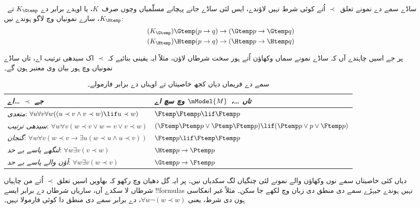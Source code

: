 \documentclass[../../../include/open-logic-section]{subfiles}
\begin{document}


ساڈے سمے دے نمونے تعلق~$\prec$ اُتے کوئی شرط نہیں لاؤندے، ایس لئی
ساڈے جانے پہچانے مسلّمیاں وچوں صرف~$K$، یا اوہدے برابر دے
$K_{\Gtemp}$ تے~$K_{\Htemp}$، سارے نمونیاں وچ لاگو ہوندے نیں:
\begin{align*}
\tag{$K_{\Gtemp}$}  \Gtemp (p \to q) & \to (\Gtemp p \to \Gtemp q)\\
\tag{$K_{\Htemp}$}  \Htemp (p \to q) & \to (\Htemp p \to \Htemp q)
\end{align*}

پر جے اسیں چاہندے آں کہ ساڈے نمونے سماں وکھاؤن اُتے ہور سخت شرطاں لاؤن،
مثلاً ایہ یقینی بنائیے کہ $\prec$ اک سیدھی ترتیب اے، تاں ساڈے
نمونیاں وچ ہور بیان وی معتبر ہون گے۔

\begin{table}[t]
  \begin{tabular}{| p{} || p{} |}
    \hline
    {\emph{جے $\prec$ \dots اے}} & {\emph{تاں \dots،~$\mModel{M}$ وچ سچ اے}} \\
    \hline \hline
    \emph{متعدی}: \newline
    $\forall u \forall v \forall w ((u \prec v \land v \prec w) \lif u \prec w)$ & 
    $\Ftemp \Ftemp p \lif \Ftemp p$  \\
    \hline 
    \emph{سیدھی ترتیب}: \newline
    $\forall w \forall v (w \prec v \lor w = v \lor v \prec w)$ &  
    $(\Ftemp \Ptemp  p \lor \Ptemp \Ftemp p) \lif (\Ptemp p \lor p \lor \Ftemp p)$\\
    \hline
    \emph{گنجان}: \newline
    $\forall w \forall v (w \prec v \to \exists u(w \prec u \land u \prec v))$ &  
    $\Ftemp p \lif \Ftemp \Ftemp p$ \\
    \hline
    \emph{لنگھے پاسے بے حد}: \newline
    $\forall w \exists v( v \prec w)$ &  
    $\Htemp p \to \Ptemp p$ \\
    \hline
    \emph{آؤن والے پاسے بے حد}: \newline
    $\forall w \exists v( w \prec v)$ &  
    $\Gtemp p \to \Ftemp p$ \\
    \hline
  \end{tabular}
  \caption{سمے دے فریماں دیاں کجھ خاصیتاں تے اوہناں دے برابر فارمولے۔}
\end{table} 

 دیاں کئی خاصیتاں سمے نوں وکھاؤن والے
نمونے لئی چنگیاں لگ سکدیاں نیں۔ پر ایہ گل دھیان وچ رکھو کہ بھاویں
اسیں تعلق $\prec$ اُتے من چاہیاں شرطاں لا سکدے آں، ساریاں شرطاں دے
برابر ایسے !!{formula}s نہیں ہوندے جیہڑے سمے دی منطق دی زبان وچ لکھے
جا سکن۔ مثلاً غیر انعکاسی ہون دی شرط، یعنی
$\forall w \lnot (w \prec w)$، دے برابر سمے دی منطق دا کوئی فارمولا نہیں۔
\end{document}
